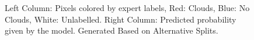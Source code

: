 \documentclass[11pt, letterpaper, journal]{IEEEtran}
\begin{document}
\begin{figure}
    \centering
    \qquad
    \qquad
    \caption{Left Column: Pixels colored by expert labels, Red: Clouds, Blue: No Clouds, White: Unlabelled. Right Column: Predicted probability given by the model. Generated Based on Alternative Splits.}
    \label{fig:Probability_Preds_alt}
\end{figure}
\end{document}

